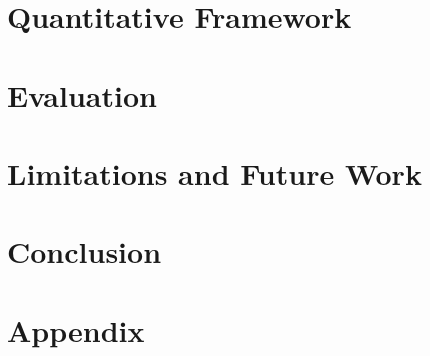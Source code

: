 \documentclass{jdf}
\begin{document}
\section{Quantitative Framework}

\section{Evaluation}

\section{Limitations and Future Work}

\section{Conclusion}

\section{Appendix}



\end{document}
